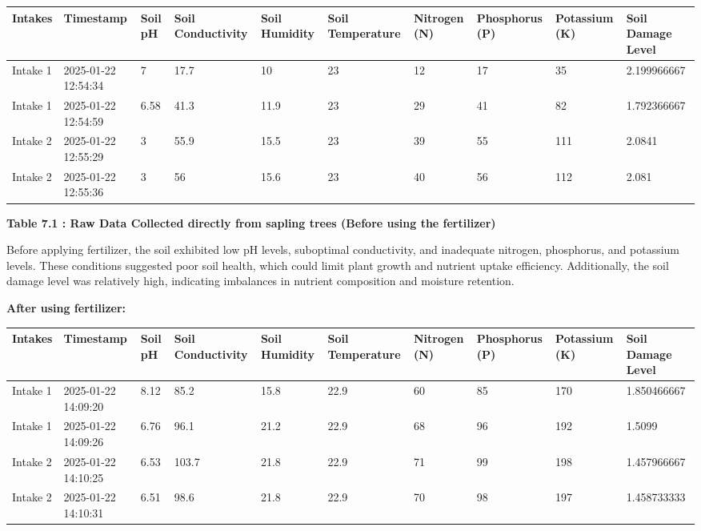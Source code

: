 \documentclass{book} %
\begin{document}
\begin{tabular}{|p{0.4in}|p{0.5in}|p{0.3in}|p{0.5in}|p{0.5in}|p{0.5in}|p{0.4in}|p{0.4in}|p{0.4in}|p{0.4in}|} \hline 
Intakes & Timestamp & Soil pH & Soil Conductivity & Soil Humidity & Soil Temperature & Nitrogen (N) & Phosphorus (P) & Potassium (K) & Soil Damage Level \\ \hline 
Intake 1 & 2025-01-22 12:54:34 & 7 & 17.7 & 10 & 23 & 12 & 17 & 35 & 2.199966667 \\ \hline 
Intake 1 & 2025-01-22 12:54:59 & 6.58 & 41.3 & 11.9 & 23 & 29 & 41 & 82 & 1.792366667 \\ \hline 
Intake 2 & 2025-01-22 12:55:29 & 3 & 55.9 & 15.5 & 23 & 39 & 55 & 111 & 2.0841 \\ \hline 
Intake 2 & 2025-01-22 12:55:36 & 3 & 56 & 15.6 & 23 & 40 & 56 & 112 & 2.081 \\ \hline 
\end{tabular}

\textbf{Table 7.1 : Raw Data Collected directly from sapling trees (Before using the fertilizer)}

\noindent Before applying fertilizer, the soil exhibited low pH levels, suboptimal conductivity, and inadequate nitrogen, phosphorus, and potassium levels. These conditions suggested poor soil health, which could limit plant growth and nutrient uptake efficiency. Additionally, the soil damage level was relatively high, indicating imbalances in nutrient composition and moisture retention.

\noindent \textbf{After using fertilizer:}

\begin{tabular}{|p{0.4in}|p{0.4in}|p{0.4in}|p{0.4in}|p{0.4in}|p{0.4in}|p{0.4in}|p{0.4in}|p{0.4in}|p{0.4in}|} \hline 
Intakes & Timestamp & Soil pH & Soil Conductivity & Soil Humidity & Soil Temperature & Nitrogen (N) & Phosphorus (P) & Potassium (K) & Soil Damage Level \\ \hline 
Intake 1 & 2025-01-22 14:09:20 & 8.12 & 85.2 & 15.8 & 22.9 & 60 & 85 & 170 & 1.850466667 \\ \hline 
Intake 1 & 2025-01-22 14:09:26 & 6.76 & 96.1 & 21.2 & 22.9 & 68 & 96 & 192 & 1.5099 \\ \hline 
Intake 2 & 2025-01-22 14:10:25 & 6.53 & 103.7 & 21.8 & 22.9 & 71 & 99 & 198 & 1.457966667 \\ \hline 
Intake 2 & 2025-01-22 14:10:31 & 6.51 & 98.6 & 21.8 & 22.9 & 70 & 98 & 197 & 1.458733333 \\ \hline 
\end{tabular}
\end{document}

